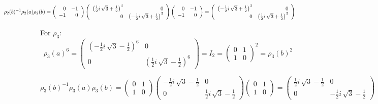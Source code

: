 \documentclass[10pt]{article}
\theoremstyle{plain}
\theoremstyle{remark}
\begin{document}
\begin{enumerate}
  \[\hspace*{-2.4cm}
    \rho_2(b)^{-1}\rho_2(a)\rho_2(b)
    =
    \left(
      \begin{array}{rr}
        0 & -1 \\
        -1 & 0
      \end{array}
    \right)
\left(\begin{array}{rr}
{\left(\frac{1}{2} i \, \sqrt{3} + \frac{1}{2}\right)}^{3} & 0 \\
0 & {\left(-\frac{1}{2} i \, \sqrt{3} + \frac{1}{2}\right)}^{3}
\end{array}\right)
    \left(
      \begin{array}{rr}
        0 & -1 \\
        -1 & 0
      \end{array}
    \right)
    =
    \left(\begin{array}{rr}
{\left(-\frac{1}{2} i \, \sqrt{3} + \frac{1}{2}\right)}^{3} & 0 \\
0 & {\left(\frac{1}{2} i \, \sqrt{3} + \frac{1}{2}\right)}^{3}
\end{array}\right)
  \]

  
  For $\rho_3$:
    \[
      \rho_3(a)^6=
      \left(\begin{array}{rr}
{\left(-\frac{1}{2} i \, \sqrt{3} - \frac{1}{2}\right)}^{6} & 0 \\
0 & {\left(\frac{1}{2} i \, \sqrt{3} - \frac{1}{2}\right)}^{6}
\end{array}\right)
    =
    I_2
    =
    \left(
      \begin{array}{rr}
        0 & 1 \\
        1 & 0
      \end{array}
    \right)^2
    =
    \rho_3(b)^2
  \]

  \[
    \rho_3(b)^{-1}\rho_3(a)\rho_3(b)
    =
    \left(
      \begin{array}{rr}
        0 & 1 \\
        1 & 0
      \end{array}
    \right)
    \left(\begin{array}{rr}
-\frac{1}{2} i \, \sqrt{3} - \frac{1}{2} & 0 \\
0 & \frac{1}{2} i \, \sqrt{3} - \frac{1}{2}
\end{array}\right)
    \left(
      \begin{array}{rr}
        0 & 1 \\
        1 & 0
      \end{array}
    \right)
    =
    \left(\begin{array}{rr}
\frac{1}{2} i \, \sqrt{3} - \frac{1}{2} & 0 \\
0 & -\frac{1}{2} i \, \sqrt{3} - \frac{1}{2}
\end{array}\right)
  \]


\end{enumerate}
\end{document}
